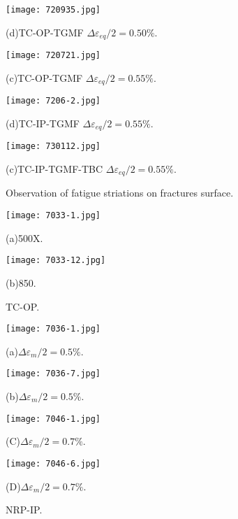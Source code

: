 \begin{figure}
  \begin{minipage}[t]{0.5\linewidth}
  \nonumber
    \centering
    \texttt{[image: 720935.jpg]}
    \centerline{(d)TC-OP-TGMF $\Delta \varepsilon_{eq}/2=0.50\%$.}
  \end{minipage}%
  \begin{minipage}[t]{0.5\linewidth}
    \centering
    \texttt{[image: 720721.jpg]}
    \centerline{(c)TC-OP-TGMF $\Delta \varepsilon_{eq}/2=0.55\%$.}
  \end{minipage}

  \begin{minipage}[t]{0.5\linewidth}
  \nonumber
    \centering
    \texttt{[image: 7206-2.jpg]}
    \centerline{(d)TC-IP-TGMF $\Delta \varepsilon_{eq}/2=0.55\%$.}
  \end{minipage}%
  \begin{minipage}[t]{0.5\linewidth}
    \centering
    \texttt{[image: 730112.jpg]}
    \centerline{(c)TC-IP-TGMF-TBC $\Delta \varepsilon_{eq}/2=0.55\%$.}
  \end{minipage}

  \caption{Observation of fatigue striations on fractures surface.}
  \label{Fig:MicrostructureofInconel718}
\end{figure}

\begin{figure}
  \begin{minipage}[t]{0.5\linewidth}
  \nonumber
    \centering
    \texttt{[image: 7033-1.jpg]}
    \centerline{(a)500X.}
  \end{minipage}%
  \begin{minipage}[t]{0.5\linewidth}
    \centering
    \texttt{[image: 7033-12.jpg]}
    \centerline{(b)850.}
  \end{minipage}
  \caption{TC-OP.}
  \label{Fig:MicrostructureofInconel718}
\end{figure}

\begin{figure}
  \begin{minipage}[t]{0.5\linewidth}
  \nonumber
    \centering
    \texttt{[image: 7036-1.jpg]}
    \centerline{(a)$\Delta \varepsilon_{m}/2=0.5\%$.}
  \end{minipage}%
  \begin{minipage}[t]{0.5\linewidth}
    \centering
    \texttt{[image: 7036-7.jpg]}
    \centerline{(b)$\Delta \varepsilon_{m}/2=0.5\%$.}
  \end{minipage}
  
  \begin{minipage}[t]{0.5\linewidth}
  \nonumber
    \centering
    \texttt{[image: 7046-1.jpg]}
    \centerline{(C)$\Delta \varepsilon_{m}/2=0.7\%$.}
  \end{minipage}%
  \begin{minipage}[t]{0.5\linewidth}
    \centering
    \texttt{[image: 7046-6.jpg]}
    \centerline{(D)$\Delta \varepsilon_{m}/2=0.7\%$.}
  \end{minipage}
  
  \caption{NRP-IP.}
  \label{Fig:MicrostructureofInconel718}
\end{figure}


